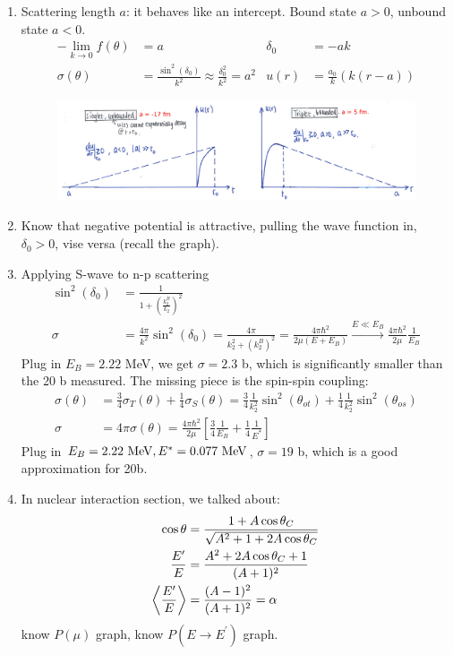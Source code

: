 \documentclass{school-22.101-notes}
\begin{document}
\begin{enumerate}
%
\item Scattering length $a$: it behaves like an intercept. Bound state $a>0$, unbound state $a<0$.  
\begin{align}
- \lim_{k \to 0} f(\theta) &= a & \delta_0 &= -ak \\
\sigma (\theta) &= \frac{\sin^2 (\delta_0)}{k^2} \approx \frac{\delta_0^2}{k^2} =  a^2 & u(r) &= \frac{a_0}{k} (k (r-a)) 
\end{align} 
\begin{figure}[ht]
    \includegraphics[width=7in]{images/scattering/s-wave-singlet-triplet.png}
\end{figure}
%
\item Know that negative potential is attractive, pulling the wave function in, $\delta_0 >0$, vise versa (recall the graph). 
%
\item Applying S-wave to n-p scattering
\begin{align}
\sin^2 (\delta_0) &= \frac{1}{1 + \left( \frac{k_2^B}{k_2} \right)^2 } \\
\sigma &= \frac{4\pi}{k^2} \sin^2 (\delta_0) = \frac{4\pi}{k_2^2 + \left(k_2^B \right)^2 } = \frac{4\pi \hbar^2}{2 \mu (E + E_B) } \xrightarrow{E \ll E_B} \frac{4 \pi \hbar^2}{2 \mu} \frac{1}{E_B} 
\end{align}
Plug in $E_B = 2.22$ MeV, we get $\sigma = 2.3$ b, which is significantly smaller than the 20 b measured. The missing piece is the spin-spin coupling:
\begin{align}
\sigma( \theta) &= \frac{3}{4} \sigma_T (\theta) + \frac{1}{4} \sigma_S (\theta) = \frac{3}{4} \frac{1}{k_2^2} \sin^2 (\theta_{ot} ) + \frac{1}{4} \frac{1}{k_2^2} \sin^2 (\theta_{os} ) \\
\sigma &= 4 \pi \sigma (\theta) = \frac{4 \pi \hbar^2}{2 \mu} \left[ \frac{3}{4} \frac{1}{E_B} + \frac{1}{4} \frac{1}{E^*} \right] 
\end{align}
Plug in $E_B = 2.22 \mbox{ } \mathrm{MeV}, E^* = 0.077 \mbox{ } \mathrm{MeV}$, $\sigma = 19$ b, which is a good approximation for 20b.
%
%
\item In nuclear interaction section, we talked about:
    \begin{align}
    \cos \theta &= \frac{1+ A \cos \theta_C}{\sqrt{A^2 + 1 + 2A \cos \theta_C} } \\
    \frac{E^{\prime}}{E} &= \frac{A^2 + 2A \cos \theta_C + 1}{(A+1)^2} \\
    \left<  \frac{E^{\prime}}{E}  \right> &= \frac{(A-1)^2}{(A+1)^2} = \alpha 
    \end{align}
    know $P(\mu)$ graph, know $P(E \to E^{\prime})$ graph.
\end{enumerate}
\end{document}
